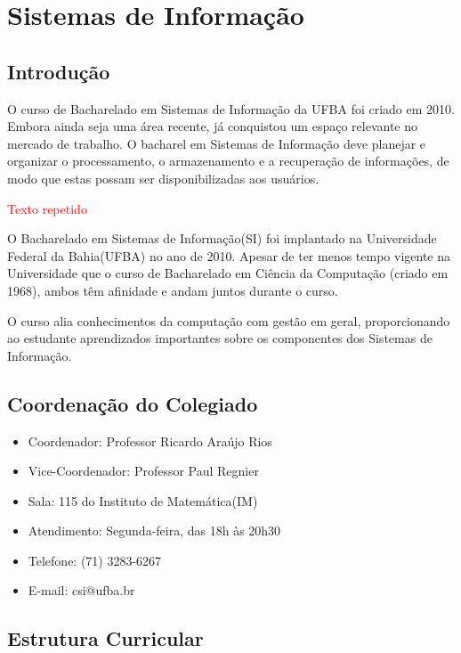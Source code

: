 \section{Sistemas de Informação}
\subsection{Introdução}

O curso de Bacharelado em Sistemas de Informação da UFBA foi criado em 2010. Embora ainda seja uma área recente, já conquistou um espaço relevante no mercado de trabalho. O bacharel em Sistemas de Informação deve planejar e organizar o processamento, o armazenamento e a recuperação de informações, de modo que estas possam ser disponibilizadas aos usuários.

\textcolor{red}{Texto repetido}

O Bacharelado em Sistemas de Informação(SI) foi implantado na Universidade Federal da Bahia(UFBA) no ano de 2010. Apesar de ter menos tempo vigente na Universidade que o curso de Bacharelado em Ciência da Computação (criado em 1968), ambos têm afinidade e andam juntos durante o curso.

O curso alia conhecimentos da computação com gestão em geral, proporcionando ao estudante aprendizados importantes sobre os componentes dos Sistemas de Informação.
  
  \subsection{Coordenação do Colegiado}
       \begin{itemize}
           \item Coordenador: Professor Ricardo Araújo Rios
           \item Vice-Coordenador: Professor Paul Regnier
           \item Sala: 115 do Instituto de Matemática(IM)
           \item Atendimento: Segunda-feira, das 18h às 20h30
           \item Telefone: (71) 3283-6267
           \item E-mail: csi@ufba.br
       \end{itemize}
       
\subsection{Estrutura Curricular}
